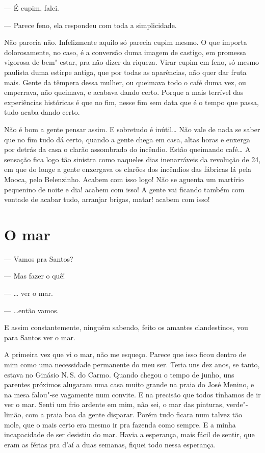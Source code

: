 --- É cupim, falei.

--- Parece feno, ela respondeu com toda a simplicidade.

Não parecia não. Infelizmente aquilo só parecia cupim mesmo. O que
importa dolorosamente, no caso, é a conversão duma imagem de castigo, em
promessa vigorosa de bem"-estar, pra não dizer da riqueza. Virar cupim em
feno, só mesmo paulista duma estirpe antiga, que por todas as
aparências, não quer dar fruta mais. Gente da têmpera dessa mulher, ou
queimava todo o café duma vez, ou emperrava, não queimava, e acabava
dando certo. Porque a mais terrível das experiências históricas é que no
fim, nesse fim sem data que é o tempo que passa, tudo acaba dando certo.

Não é bom a gente pensar assim. E sobretudo é inútil\ldots{} Não vale de nada
se saber que no fim tudo dá certo, quando a gente chega em casa, altas
horas e enxerga por detrás da casa o clarão assombrado do incêndio.
Estão queimando café\ldots{} A sensação fica logo tão sinistra como naqueles
dias inenarráveis da revolução de 24, em que do longe a gente enxergava
os clarões dos incêndios das fábricas lá pela Mooca, pelo Belenzinho.
Acabem com isso logo! Não se aguenta um martírio pequenino de noite e
dia! acabem com isso! A gente vai ficando também com vontade de acabar
tudo, arranjar brigas, matar! acabem com isso!

\chapter{O mar}

--- Vamos pra Santos?

--- Mas fazer o quê!

--- \ldots{} ver o mar.

--- \ldots{}então vamos.

E assim constantemente, ninguém sabendo, feito os amantes clandestinos,
vou para Santos ver o mar.

A primeira vez que vi o mar, não me esqueço. Parece que isso ficou
dentro de mim como uma necessidade permanente do meu ser. Teria uns dez
anos, se tanto, estava no Ginásio N.\,S. do Carmo. Quando chegou o tempo
de junho, uns parentes próximos alugaram uma casa muito grande na praia
do José Menino, e na mesa falou"-se vagamente num convite. E na precisão
que todos tínhamos de ir ver o mar. Senti um frio ardente em mim, não
sei, o mar das pinturas, verde"-limão, com a praia boa da gente disparar.
Porém tudo ficara num talvez tão mole, que o mais certo era mesmo ir pra
fazenda como sempre. E a minha incapacidade de ser desistiu do mar.
Havia a esperança, mais fácil de sentir, que eram as férias pra d'aí a
duas semanas, fiquei todo nessa esperança.

